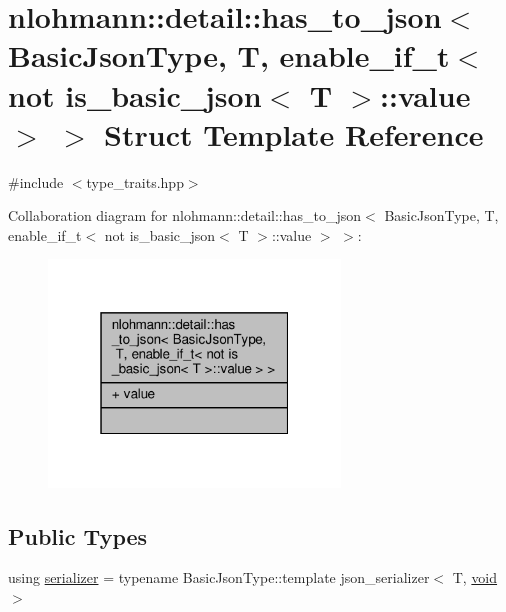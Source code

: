 \hypertarget{structnlohmann_1_1detail_1_1has__to__json_3_01_basic_json_type_00_01_t_00_01enable__if__t_3_01nob111e71d40e2273c290d1ce5c6a3b84f}{}\section{nlohmann\+:\+:detail\+:\+:has\+\_\+to\+\_\+json$<$ Basic\+Json\+Type, T, enable\+\_\+if\+\_\+t$<$ not is\+\_\+basic\+\_\+json$<$ T $>$\+:\+:value $>$ $>$ Struct Template Reference}
\label{structnlohmann_1_1detail_1_1has__to__json_3_01_basic_json_type_00_01_t_00_01enable__if__t_3_01nob111e71d40e2273c290d1ce5c6a3b84f}


{\ttfamily \#include $<$type\+\_\+traits.\+hpp$>$}



Collaboration diagram for nlohmann\+:\+:detail\+:\+:has\+\_\+to\+\_\+json$<$ Basic\+Json\+Type, T, enable\+\_\+if\+\_\+t$<$ not is\+\_\+basic\+\_\+json$<$ T $>$\+:\+:value $>$ $>$\+:\nopagebreak
\begin{figure}[H]
\begin{center}
\leavevmode
\includegraphics[width=220pt]{structnlohmann_1_1detail_1_1has__to__json_3_01_basic_json_type_00_01_t_00_01enable__if__t_3_01noda0f2067175e958628a18743c94771b9}
\end{center}
\end{figure}
\subsection*{Public Types}
\begin{DoxyCompactItemize}
\item 
using \hyperlink{structnlohmann_1_1detail_1_1has__to__json_3_01_basic_json_type_00_01_t_00_01enable__if__t_3_01nob111e71d40e2273c290d1ce5c6a3b84f_a479098e9480e0adb30fb3fe3586a8005}{serializer} = typename Basic\+Json\+Type\+::template json\+\_\+serializer$<$ T, \hyperlink{namespacenlohmann_1_1detail_a59fca69799f6b9e366710cb9043aa77d}{void} $>$
\end{DoxyCompactItemize}
